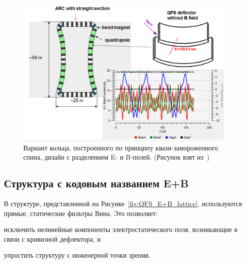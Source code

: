 \begin{figure}[h!]
	\centering
	\includegraphics[width=\linewidth]{images/chapter2/6_3_lattice}
	\caption{Вариант кольца, построенного по принципу квази-замороженного спина, дизайн с разделением E- и B-полей. (Рисунок взят из~\cite{Senichev:Lattices})\label{fig:QFS_6_3_lattice}}
\end{figure}

\subsection{Структура с кодовым названием E+B}\label{sec:QFS_EB_lattice}

В структуре, представленной на Рисунке~\ref{fig:QFS_E+B_lattice}, используются прямые, статические фильтры Вина. Это позволяет:
\begin{enumerate*}
	\item исключить нелинейные компоненты электростатического поля, возникающие в связи с кривизной дефлектора, и 
	\item упростить структуру с инженерной точки зрения.
\end{enumerate*}

